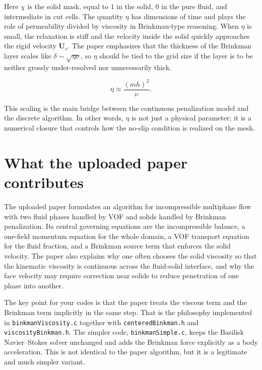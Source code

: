 \documentclass[11pt,a4paper]{article}
\begin{document}
Here $\chi$ is the solid mask, equal to $1$ in the solid, $0$ in the pure fluid, and intermediate in cut cells. The quantity $\eta$ has dimensions of time and plays the role of permeability divided by viscosity in Brinkman-type reasoning. When $\eta$ is small, the relaxation is stiff and the velocity inside the solid quickly approaches the rigid velocity $\bm{U}_s$. The paper emphasizes that the thickness of the Brinkman layer scales like $\delta \sim \sqrt{\eta\nu}$, so $\eta$ should be tied to the grid size if the layer is to be neither grossly under-resolved nor unnecessarily thick.

\begin{equation}
\eta \approx \frac{(m h)^2}{\nu}.
\end{equation}

This scaling is the main bridge between the continuous penalization model and the discrete algorithm. In other words, $\eta$ is not just a physical parameter; it is a numerical closure that controls how the no-slip condition is realized on the mesh.

\section{What the uploaded paper contributes}

The uploaded paper formulates an algorithm for incompressible multiphase flow with two fluid phases handled by VOF and solids handled by Brinkman penalization. Its central governing equations are the incompressible balance, a one-field momentum equation for the whole domain, a VOF transport equation for the fluid fraction, and a Brinkman source term that enforces the solid velocity. The paper also explains why one often chooses the solid viscosity so that the kinematic viscosity is continuous across the fluid-solid interface, and why the face velocity may require correction near solids to reduce penetration of one phase into another.

The key point for your codes is that the paper treats the viscous term and the Brinkman term implicitly in the same step. That is the philosophy implemented in \texttt{binkmanViscosity.c} together with \texttt{centeredBinkman.h} and \texttt{viscosityBinkman.h}. The simpler code, \texttt{binkmanSimple.c}, keeps the Basilisk Navier--Stokes solver unchanged and adds the Brinkman force explicitly as a body acceleration. This is not identical to the paper algorithm, but it is a legitimate and much simpler variant.
\end{document}
